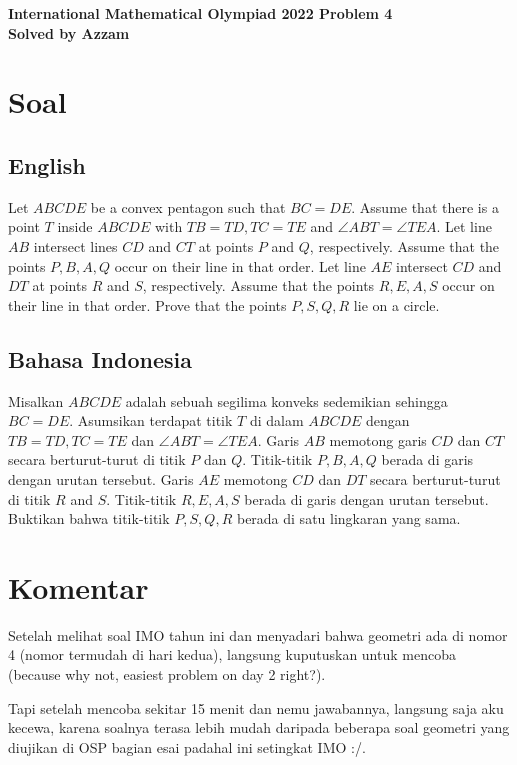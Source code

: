 \begin{center}
    \textbf{\Huge International Mathematical Olympiad 2022 Problem 4}\\
    \textbf{\large Solved by Azzam}
\end{center}


\vspace{-1.5cm}

\newpage
\section{Soal}
\subsection{English}
Let $ABCDE$ be a convex pentagon such that $BC=DE$. Assume that there is a point $T$ inside $ABCDE$ with $TB=TD,TC=TE$ and $\angle ABT = \angle TEA$. Let line $AB$ intersect lines $CD$ and $CT$ at points $P$ and $Q$, respectively. Assume that the points $P,B,A,Q$ occur on their line in that order. Let line $AE$ intersect $CD$ and $DT$ at points $R$ and $S$, respectively. Assume that the points $R,E,A,S$ occur on their line in that order. Prove that the points $P,S,Q,R$ lie on a circle.

\subsection{Bahasa Indonesia}
Misalkan $ABCDE$ adalah sebuah segilima konveks sedemikian sehingga $BC=DE$. Asumsikan terdapat titik $T$ di dalam $ABCDE$ dengan $TB=TD,TC=TE$ dan $\angle ABT = \angle TEA$. Garis $AB$ memotong garis $CD$ dan $CT$ secara berturut-turut di titik $P$ dan $Q$. Titik-titik $P,B,A,Q$ berada di garis dengan urutan tersebut. Garis $AE$ memotong $CD$ dan $DT$ secara berturut-turut di titik $R$ and $S$. Titik-titik $R,E,A,S$ berada di garis dengan urutan tersebut. Buktikan bahwa titik-titik $P,S,Q,R$ berada di satu lingkaran yang sama.

\newpage
\section{Komentar}
Setelah melihat soal IMO tahun ini dan menyadari bahwa geometri ada di nomor 4 (nomor termudah di hari kedua), langsung kuputuskan untuk mencoba (because why not, easiest problem on day 2 right?).

Tapi setelah mencoba sekitar 15 menit dan nemu jawabannya, langsung saja aku kecewa, karena soalnya terasa lebih mudah daripada beberapa soal geometri yang diujikan di OSP bagian esai padahal ini setingkat IMO :/.

